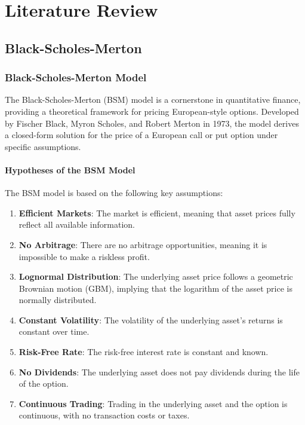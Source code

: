 \documentclass[11pt, oneside, a4paper, titlepage]{report}
\begin{document}
\chapter{Literature Review}
\section{Black-Scholes-Merton}

\subsection{Black-Scholes-Merton Model}

The Black-Scholes-Merton (BSM) model is a cornerstone in quantitative finance, providing a theoretical framework for pricing European-style options. Developed by Fischer Black, Myron Scholes, and Robert Merton in 1973, the model derives a closed-form solution for the price of a European call or put option under specific assumptions.

\subsubsection{Hypotheses of the BSM Model}

The BSM model is based on the following key assumptions:

\begin{enumerate}
    \item \textbf{Efficient Markets}: The market is efficient, meaning that asset prices fully reflect all available information.
    \item \textbf{No Arbitrage}: There are no arbitrage opportunities, meaning it is impossible to make a riskless profit.
    \item \textbf{Lognormal Distribution}: The underlying asset price follows a geometric Brownian motion (GBM), implying that the logarithm of the asset price is normally distributed.
    \item \textbf{Constant Volatility}: The volatility of the underlying asset's returns is constant over time.
    \item \textbf{Risk-Free Rate}: The risk-free interest rate is constant and known.
    \item \textbf{No Dividends}: The underlying asset does not pay dividends during the life of the option.
    \item \textbf{Continuous Trading}: Trading in the underlying asset and the option is continuous, with no transaction costs or taxes.
\end{enumerate}
\end{document}
